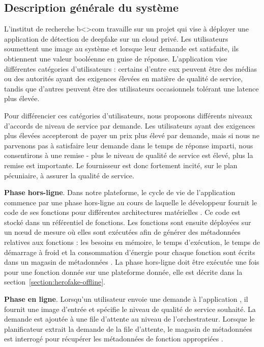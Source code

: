 \subsection{Description générale du système}

L'institut de recherche b{\textless\textgreater}com travaille sur un projet qui vise à déployer une application de détection de deepfake sur un cloud privé. Les utilisateurs soumettent une image au système et lorsque leur demande est satisfaite, ils obtiennent une valeur booléenne en guise de réponse. L'application vise différentes catégories d'utilisateurs : certains d'entre eux peuvent être des médias ou des autorités ayant des exigences élevées en matière de qualité de service, tandis que d'autres peuvent être des utilisateurs occasionnels tolérant une latence plus élevée.

Pour différencier ces catégories d'utilisateurs, nous proposons différents niveaux d'accords de niveau de service par demande. Les utilisateurs ayant des exigences plus élevées accepteront de payer un prix plus élevé par demande, mais si nous ne parvenons pas à satisfaire leur demande dans le temps de réponse imparti, nous consentirons à une remise - plus le niveau de qualité de service est élevé, plus la remise est importante. Le fournisseur est donc fortement incité, sur le plan pécuniaire, à assurer la qualité de service.

\textbf{Phase hors-ligne}. Dans notre plateforme, le cycle de vie de l'application commence par une phase hors-ligne au cours de laquelle le développeur fournit le code de ses fonctions pour différentes architectures matérielles . Ce code est stocké dans un référentiel de fonctions. Les fonctions sont ensuite déployées sur un nœud de mesure  où elles sont exécutées afin de générer des métadonnées relatives aux fonctions : les besoins en mémoire, le temps d'exécution, le temps de démarrage à froid et la consommation d'énergie pour chaque fonction sont écrits dans un magasin de métadonnées . La phase hors-ligne doit être exécutée une fois pour une fonction donnée sur une plateforme donnée, elle est décrite dans la section~\ref{section:herofake-offline}.

\textbf{Phase en ligne}. Lorsqu'un utilisateur envoie une demande à l'application , il fournit une image d'entrée et spécifie le niveau de qualité de service souhaité. La demande est ajoutée à une file d'attente  au niveau de l'orchestrateur. Lorsque le planificateur extrait la demande de la file d'attente, le magasin de métadonnées est interrogé pour récupérer les métadonnées de fonction appropriées .

